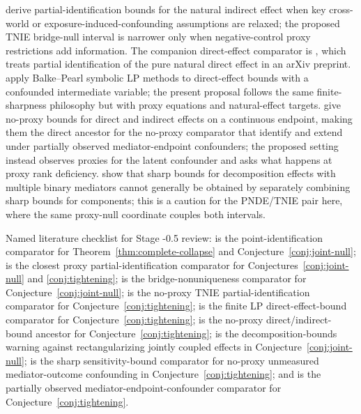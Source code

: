 \documentclass[11pt]{article}
\theoremstyle{definition}
\theoremstyle{plain}
\theoremstyle{remark}
\begin{document}
\citet{MilesKankiMeloniTchetgen2017} derive partial-identification bounds for the natural indirect effect when key cross-world or exposure-induced-confounding assumptions are relaxed; the proposed TNIE bridge-null interval is narrower only when negative-control proxy restrictions add information.  The companion direct-effect comparator is \citet{MilesKankiMeloniTchetgen2015}, which treats partial identification of the pure natural direct effect in an arXiv preprint.  \citet{CaiKurokiPearlTian2008} apply Balke--Pearl symbolic LP methods to direct-effect bounds with a confounded intermediate variable; the present proposal follows the same finite-sharpness philosophy but with proxy equations and natural-effect targets.  \citet{LuoGeng2016} give no-proxy bounds for direct and indirect effects on a continuous endpoint, making them the direct ancestor for the no-proxy comparator that \citet{HanLuoZhangGu2026} identify and extend under partially observed mediator-endpoint confounders; the proposed setting instead observes proxies for the latent confounder and asks what happens at proxy rank deficiency.  \citet{GabrielSachsSjolander2023} show that sharp bounds for decomposition effects with multiple binary mediators cannot generally be obtained by separately combining sharp bounds for components; this is a caution for the PNDE/TNIE pair here, where the same proxy-null coordinate couples both intervals.

Named literature checklist for Stage -0.5 review: \citet{DukesShpitserTchetgen2023} is the point-identification comparator for Theorem~\ref{thm:complete-collapse} and Conjecture~\ref{conj:joint-null}; \citet{GhassamiShpitserTchetgen2023} is the closest proxy partial-identification comparator for Conjectures~\ref{conj:joint-null} and \ref{conj:tightening}; \citet{ZhangLiMiaoTchetgen2023} is the bridge-nonuniqueness comparator for Conjecture~\ref{conj:joint-null}; \citet{MilesKankiMeloniTchetgen2017} is the no-proxy TNIE partial-identification comparator for Conjecture~\ref{conj:tightening}; \citet{CaiKurokiPearlTian2008} is the finite LP direct-effect-bound comparator for Conjecture~\ref{conj:tightening}; \citet{LuoGeng2016} is the no-proxy direct/indirect-bound ancestor for Conjecture~\ref{conj:tightening}; \citet{GabrielSachsSjolander2023} is the decomposition-bounds warning against rectangularizing jointly coupled effects in Conjecture~\ref{conj:joint-null}; \citet{DingVanderWeele2016} is the sharp sensitivity-bound comparator for no-proxy unmeasured mediator-outcome confounding in Conjecture~\ref{conj:tightening}; and \citet{HanLuoZhangGu2026} is the partially observed mediator-endpoint-confounder comparator for Conjecture~\ref{conj:tightening}.
\end{document}

